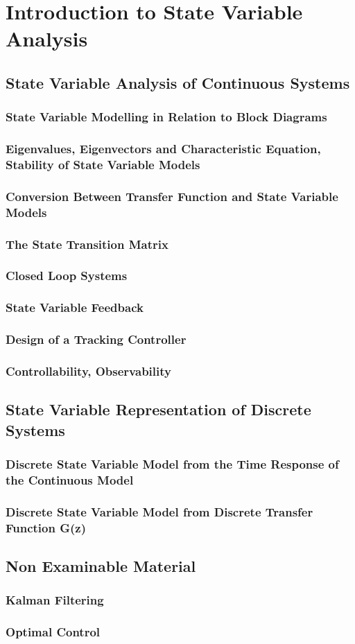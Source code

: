 \chapter{Introduction to State Variable Analysis}

\section{State Variable Analysis of Continuous Systems}
\subsection*{State Variable Modelling in Relation to Block Diagrams}
\subsection*{Eigenvalues, Eigenvectors and Characteristic Equation, Stability of State Variable Models}
\subsection*{Conversion Between Transfer Function and State Variable Models}
\subsection*{The State Transition Matrix}
\subsection*{Closed Loop Systems}
\subsection*{State Variable Feedback}
\subsection*{Design of a Tracking Controller}
\subsection*{Controllability, Observability}

\section{State Variable Representation of Discrete Systems}
\subsection*{Discrete State Variable Model from the Time Response of the Continuous Model}
\subsection*{Discrete State Variable Model from Discrete Transfer Function G(z)}

\section{Non Examinable Material}
\subsection*{Kalman Filtering}
\subsection*{Optimal Control}